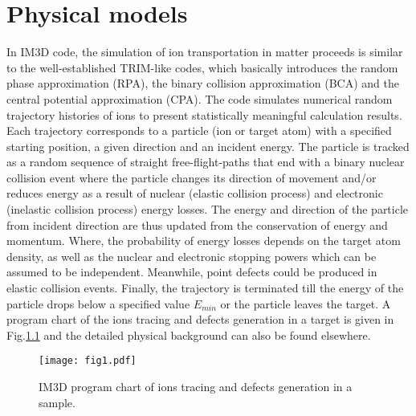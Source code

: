 
\chapter{Physical models} %

\label{AppendixA} %


In IM3D code, the simulation of ion transportation in matter proceeds is similar to the well-established TRIM-like codes, which basically introduces the random phase approximation (RPA), the binary collision approximation (BCA) and the central potential approximation (CPA)\cite{Ziegler:2010,Schiettekatte:2008,Biersack:1980}. The code simulates numerical random trajectory histories of ions to present statistically meaningful calculation results. Each trajectory corresponds to a particle (ion or target atom) with a specified starting position, a given direction and an incident energy. The particle is tracked as a random sequence of straight free-flight-paths that end with a binary nuclear collision event where the particle changes its direction of movement and/or reduces energy as a result of nuclear (elastic collision process) and electronic (inelastic collision process) energy losses. The energy and direction of the particle from incident direction are thus updated from the conservation of energy and momentum. Where, the probability of energy losses depends on the target atom density, as well as the nuclear and electronic stopping powers which can be assumed to be independent. Meanwhile, point defects could be produced in elastic collision events. Finally, the trajectory is terminated till the energy of the particle drops below a specified value $E_{min}$ or the particle leaves the target. A program chart of the ions tracing and defects generation in a target is given in Fig.\ref{Fig.1} and the detailed physical background can also be found elsewhere\cite{Ziegler:2010}.

\begin{figure}[!ht]\centering
\texttt{[image: fig1.pdf]}
\caption{IM3D program chart of ions tracing and defects generation in a sample.} \label{Fig.1}
\end{figure}

